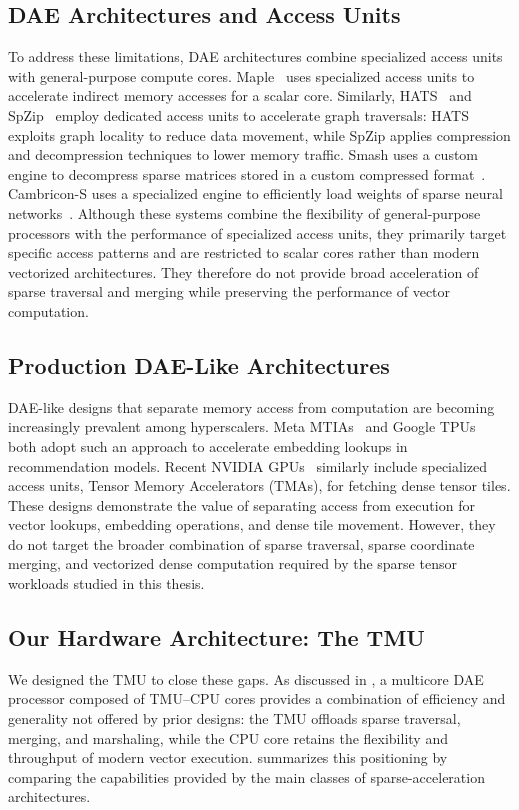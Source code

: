 \subsection{DAE Architectures and Access Units} \label{sec:related-work-dae-architectures}
To address these limitations, DAE architectures combine specialized access units with general-purpose compute cores. Maple~\cite{orenesvera2022isca} uses specialized access units to accelerate indirect memory accesses for a scalar core. Similarly, HATS~\cite{mukkara2018micro} and SpZip~\cite{yang2021isca} employ dedicated access units to accelerate graph traversals: HATS exploits graph locality to reduce data movement, while SpZip applies compression and decompression techniques to lower memory traffic. Smash uses a custom engine to decompress sparse matrices stored in a custom compressed format~\cite{kanellopoulos2019micro}. Cambricon-S uses a specialized engine to efficiently load weights of sparse neural networks~\cite{zhou2018micro}. Although these systems combine the flexibility of general-purpose processors with the performance of specialized access units, they primarily target specific access patterns and are restricted to scalar cores rather than modern vectorized architectures. They therefore do not provide broad acceleration of sparse traversal and merging while preserving the performance of vector computation.



\subsection{Production DAE-Like Architectures} \label{sec:related-work-production-dae-architectures}
DAE-like designs that separate memory access from computation are becoming increasingly prevalent among hyperscalers. Meta MTIAs~\cite{firoozshahian2023isca} and Google TPUs~\cite{jouppi2023isca} both adopt such an approach to accelerate embedding lookups in recommendation models. Recent NVIDIA GPUs~\cite{nvidia2024h100,nvidia2022hopper} similarly include specialized access units, Tensor Memory Accelerators (TMAs), for fetching dense tensor tiles. These designs demonstrate the value of separating access from execution for vector lookups, embedding operations, and dense tile movement. However, they do not target the broader combination of sparse traversal, sparse coordinate merging, and vectorized dense computation required by the sparse tensor workloads studied in this thesis.

\subsection{Our Hardware Architecture: The TMU} \label{sec:related-work-our-tmu}
We designed the TMU to close these gaps. As discussed in , a multicore DAE processor composed of TMU--CPU cores provides a combination of efficiency and generality not offered by prior designs: the TMU offloads sparse traversal, merging, and marshaling, while the CPU core retains the flexibility and throughput of modern vector execution.  summarizes this positioning by comparing the capabilities provided by the main classes of sparse-acceleration architectures.

